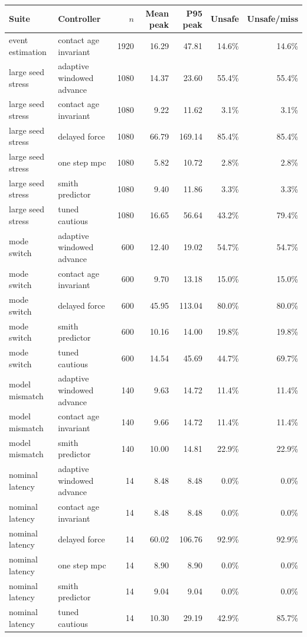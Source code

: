 \begin{tabular}{llrrrrr}\toprule
Suite & Controller & $n$ & Mean peak & P95 peak & Unsafe & Unsafe/miss\\
\midrule
event estimation & contact age invariant & 1920 & 16.29 & 47.81 & 14.6\% & 14.6\%\\
large seed stress & adaptive windowed advance & 1080 & 14.37 & 23.60 & 55.4\% & 55.4\%\\
large seed stress & contact age invariant & 1080 & 9.22 & 11.62 & 3.1\% & 3.1\%\\
large seed stress & delayed force & 1080 & 66.79 & 169.14 & 85.4\% & 85.4\%\\
large seed stress & one step mpc & 1080 & 5.82 & 10.72 & 2.8\% & 2.8\%\\
large seed stress & smith predictor & 1080 & 9.40 & 11.86 & 3.3\% & 3.3\%\\
large seed stress & tuned cautious & 1080 & 16.65 & 56.64 & 43.2\% & 79.4\%\\
mode switch & adaptive windowed advance & 600 & 12.40 & 19.02 & 54.7\% & 54.7\%\\
mode switch & contact age invariant & 600 & 9.70 & 13.18 & 15.0\% & 15.0\%\\
mode switch & delayed force & 600 & 45.95 & 113.04 & 80.0\% & 80.0\%\\
mode switch & smith predictor & 600 & 10.16 & 14.00 & 19.8\% & 19.8\%\\
mode switch & tuned cautious & 600 & 14.54 & 45.69 & 44.7\% & 69.7\%\\
model mismatch & adaptive windowed advance & 140 & 9.63 & 14.72 & 11.4\% & 11.4\%\\
model mismatch & contact age invariant & 140 & 9.66 & 14.72 & 11.4\% & 11.4\%\\
model mismatch & smith predictor & 140 & 10.00 & 14.81 & 22.9\% & 22.9\%\\
nominal latency & adaptive windowed advance & 14 & 8.48 & 8.48 & 0.0\% & 0.0\%\\
nominal latency & contact age invariant & 14 & 8.48 & 8.48 & 0.0\% & 0.0\%\\
nominal latency & delayed force & 14 & 60.02 & 106.76 & 92.9\% & 92.9\%\\
nominal latency & one step mpc & 14 & 8.90 & 8.90 & 0.0\% & 0.0\%\\
nominal latency & smith predictor & 14 & 9.04 & 9.04 & 0.0\% & 0.0\%\\
nominal latency & tuned cautious & 14 & 10.30 & 29.19 & 42.9\% & 85.7\%\\
\bottomrule\end{tabular}
